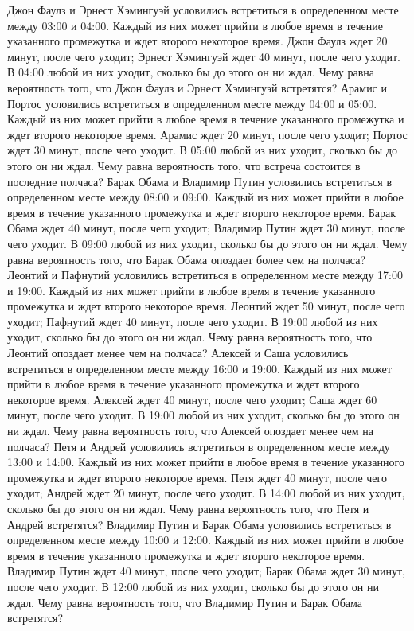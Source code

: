 Джон Фаулз и Эрнест Хэмингуэй условились встретиться в определенном месте между 03:00 и 04:00. Каждый из них может прийти в любое время в течение указанного промежутка и ждет второго некоторое время. Джон Фаулз ждет 20 минут, после чего уходит; Эрнест Хэмингуэй ждет 40 минут, после чего уходит. В 04:00 любой из них уходит, сколько бы до этого он ни ждал. Чему равна вероятность того, что Джон Фаулз и Эрнест Хэмингуэй встретятся?
Арамис и Портос условились встретиться в определенном месте между 04:00 и 05:00. Каждый из них может прийти в любое время в течение указанного промежутка и ждет второго некоторое время. Арамис ждет 20 минут, после чего уходит; Портос ждет 30 минут, после чего уходит. В 05:00 любой из них уходит, сколько бы до этого он ни ждал. Чему равна вероятность того, что встреча состоится в последние полчаса?
Барак Обама и Владимир Путин условились встретиться в определенном месте между 08:00 и 09:00. Каждый из них может прийти в любое время в течение указанного промежутка и ждет второго некоторое время. Барак Обама ждет 40 минут, после чего уходит; Владимир Путин ждет 30 минут, после чего уходит. В 09:00 любой из них уходит, сколько бы до этого он ни ждал. Чему равна вероятность того, что Барак Обама опоздает более чем на полчаса?
Леонтий и Пафнутий условились встретиться в определенном месте между 17:00 и 19:00. Каждый из них может прийти в любое время в течение указанного промежутка и ждет второго некоторое время. Леонтий ждет 50 минут, после чего уходит; Пафнутий ждет 40 минут, после чего уходит. В 19:00 любой из них уходит, сколько бы до этого он ни ждал. Чему равна вероятность того, что Леонтий опоздает менее чем на полчаса?
Алексей и Саша условились встретиться в определенном месте между 16:00 и 19:00. Каждый из них может прийти в любое время в течение указанного промежутка и ждет второго некоторое время. Алексей ждет 40 минут, после чего уходит; Саша ждет 60 минут, после чего уходит. В 19:00 любой из них уходит, сколько бы до этого он ни ждал. Чему равна вероятность того, что Алексей опоздает менее чем на полчаса?
Петя и Андрей условились встретиться в определенном месте между 13:00 и 14:00. Каждый из них может прийти в любое время в течение указанного промежутка и ждет второго некоторое время. Петя ждет 40 минут, после чего уходит; Андрей ждет 20 минут, после чего уходит. В 14:00 любой из них уходит, сколько бы до этого он ни ждал. Чему равна вероятность того, что Петя и Андрей встретятся?
Владимир Путин и Барак Обама условились встретиться в определенном месте между 10:00 и 12:00. Каждый из них может прийти в любое время в течение указанного промежутка и ждет второго некоторое время. Владимир Путин ждет 40 минут, после чего уходит; Барак Обама ждет 30 минут, после чего уходит. В 12:00 любой из них уходит, сколько бы до этого он ни ждал. Чему равна вероятность того, что Владимир Путин и Барак Обама встретятся?
